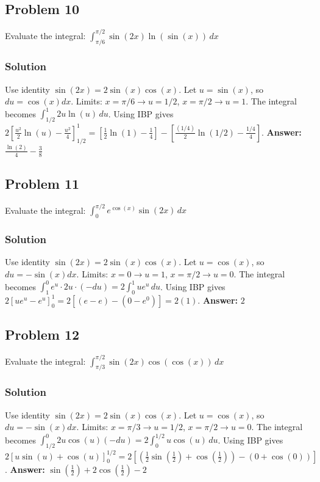 \documentclass{article}
\begin{document}
\subsection{Problem 10}
Evaluate the integral: $ \int_{\pi/6}^{\pi/2} \sin(2x) \ln(\sin(x)) \,dx $
\subsubsection*{Solution}
Use identity $\sin(2x) = 2\sin(x)\cos(x)$. Let $u=\sin(x)$, so $du=\cos(x)dx$.
Limits: $x=\pi/6 \to u=1/2$, $x=\pi/2 \to u=1$.
The integral becomes $ \int_{1/2}^{1} 2u \ln(u) \,du $.
Using IBP gives $ 2[\frac{u^2}{2}\ln(u) - \frac{u^2}{4}]_{1/2}^{1} = [\frac{1}{2}\ln(1) - \frac{1}{4}] - [\frac{(1/4)}{2}\ln(1/2) - \frac{1/4}{4}] $.
\textbf{Answer:} $ \frac{\ln(2)}{4} - \frac{3}{8} $


\subsection{Problem 11}
Evaluate the integral: $ \int_{0}^{\pi/2} e^{\cos(x)} \sin(2x) \,dx $
\subsubsection*{Solution}
Use identity $\sin(2x) = 2\sin(x)\cos(x)$. Let $u=\cos(x)$, so $du=-\sin(x)dx$.
Limits: $x=0 \to u=1$, $x=\pi/2 \to u=0$.
The integral becomes $ \int_{1}^{0} e^u \cdot 2u \cdot (-du) = 2\int_{0}^{1} u e^u \,du $.
Using IBP gives $ 2[ue^u - e^u]_{0}^{1} = 2[(e-e) - (0-e^0)] = 2(1) $.
\textbf{Answer:} $ 2 $


\subsection{Problem 12}
Evaluate the integral: $ \int_{\pi/3}^{\pi/2} \sin(2x) \cos(\cos(x)) \,dx $
\subsubsection*{Solution}
Use identity $\sin(2x) = 2\sin(x)\cos(x)$. Let $u=\cos(x)$, so $du=-\sin(x)dx$.
Limits: $x=\pi/3 \to u=1/2$, $x=\pi/2 \to u=0$.
The integral becomes $ \int_{1/2}^{0} 2u \cos(u) (-du) = 2\int_{0}^{1/2} u \cos(u) \,du $.
Using IBP gives $ 2[u\sin(u) + \cos(u)]_{0}^{1/2} = 2[(\frac{1}{2}\sin(\frac{1}{2}) + \cos(\frac{1}{2})) - (0 + \cos(0))] $.
\textbf{Answer:} $ \sin(\frac{1}{2}) + 2\cos(\frac{1}{2}) - 2 $
\end{document}
